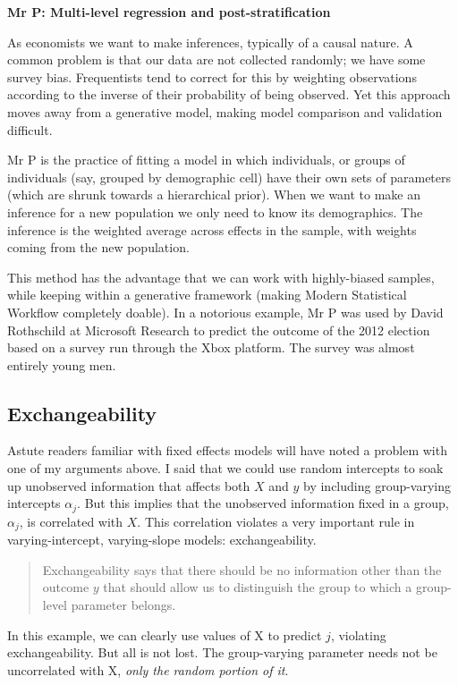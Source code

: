 \documentclass[]{book}
\begin{document}
\textbf{Mr P: Multi-level regression and post-stratification}

As economists we want to make inferences, typically of a causal nature.
A common problem is that our data are not collected randomly; we have
some survey bias. Frequentists tend to correct for this by weighting
observations according to the inverse of their probability of being
observed. Yet this approach moves away from a generative model, making
model comparison and validation difficult.

Mr P is the practice of fitting a model in which individuals, or groups
of individuals (say, grouped by demographic cell) have their own sets of
parameters (which are shrunk towards a hierarchical prior). When we want
to make an inference for a new population we only need to know its
demographics. The inference is the weighted average across effects in
the sample, with weights coming from the new population.

This method has the advantage that we can work with highly-biased
samples, while keeping within a generative framework (making Modern
Statistical Workflow completely doable). In a notorious example, Mr P
was used by David Rothschild at Microsoft Research to predict the
outcome of the 2012 election based on a survey run through the Xbox
platform. The survey was almost entirely young men.

\subsection{Exchangeability}\label{exchangeability}

Astute readers familiar with fixed effects models will have noted a
problem with one of my arguments above. I said that we could use random
intercepts to soak up unobserved information that affects both \(X\) and
\(y\) by including group-varying intercepts \(\alpha_{j}\). But this
implies that the unobserved information fixed in a group,
\(\alpha_{j}\), is correlated with \(X\). This correlation violates a
very important rule in varying-intercept, varying-slope models:
exchangeability.

\begin{quote}
Exchangeability says that there should be no information other than the
outcome \(y\) that should allow us to distinguish the group to which a
group-level parameter belongs.
\end{quote}

In this example, we can clearly use values of X to predict \(j\),
violating exchangeability. But all is not lost. The group-varying
parameter needs not be uncorrelated with X, \emph{only the random
portion of it}.
\end{document}
